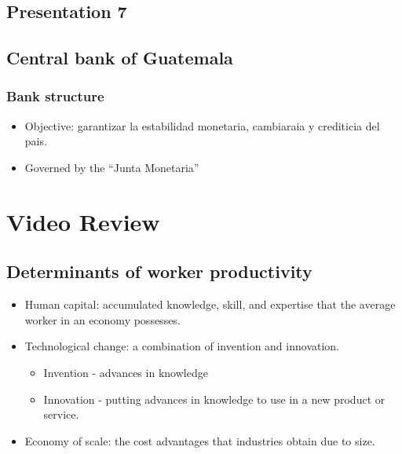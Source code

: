 \documentclass[openany]{book}
\begin{document}
\section{Presentation 7}
\section{Central bank of Guatemala}
\subsection{Bank structure}
\begin{itemize}
    \item Objective: garantizar la estabilidad monetaria, cambiaraia y crediticia del pais.
    \item Governed by the ``Junta Monetaria''
\end{itemize}


\chapter{Video Review}
\section{Determinants of worker productivity} 
\begin{itemize}
    \item Human capital: accumulated knowledge, skill, and expertise that the average worker in an economy possesses. 
    \item Technological change: a combination of invention and innovation.
        \begin{itemize}
            \item Invention - advances in knowledge 
            \item Innovation - putting advances in knowledge to use in a new product or service.
        \end{itemize}
    \item Economy of scale: the cost advantages that industries obtain due to size. 
\end{itemize}
\end{document}
